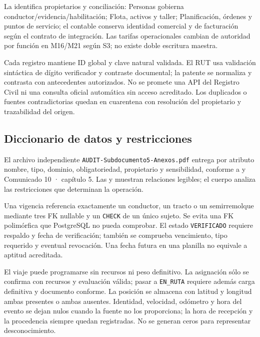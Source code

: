 La  identifica propietarios y conciliación: Personas gobierna conductor/evidencia/habilitación; Flota, activos y taller; Planificación, órdenes y puntos de servicio; el contable conserva identidad comercial y de facturación según el contrato de integración. Las tarifas operacionales cambian de autoridad por función en M16/M21 según S3; no existe doble escritura maestra.

Cada registro mantiene ID global y clave natural validada. El RUT usa validación sintáctica de dígito verificador y contraste documental; la patente se normaliza y contrasta con antecedentes autorizados. No se promete una API del Registro Civil ni una consulta oficial automática sin acceso acreditado. Los duplicados o fuentes contradictorias quedan en cuarentena con resolución del propietario y trazabilidad del origen.

\FloatBarrier
\subsection{Diccionario de datos y restricciones}\label{sec:5-diccionario}\label{sec:05-diccionario-de-datos-y-restricciones}

El archivo independiente \texttt{AUDIT-Subdocumento5-Anexos.pdf} entrega por atributo nombre, tipo, dominio, obligatoriedad, propietario y sensibilidad, conforme a  y Comunicado 10 · capítulo 5. Las  y  muestran relaciones legibles; el cuerpo analiza las restricciones que determinan la operación.

Una vigencia referencia exactamente un conductor, un tracto o un semirremolque mediante tres FK nullable y un \texttt{CHECK} de un único sujeto. Se evita una FK polimórfica que PostgreSQL no pueda comprobar. El estado \texttt{VERIFICADO} requiere respaldo y fecha de verificación; también se comprueba vencimiento, tipo requerido y eventual revocación. Una fecha futura en una planilla no equivale a aptitud acreditada.

El viaje puede programarse sin recursos ni peso definitivo. La asignación sólo se confirma con recursos y evaluación válida; pasar a \texttt{EN\_\allowbreak{}RUTA} requiere además carga definitiva y documento conforme. La posición se almacena con latitud y longitud ambas presentes o ambas ausentes. Identidad, velocidad, odómetro y hora del evento se dejan nulos cuando la fuente no los proporciona; la hora de recepción y la procedencia siempre quedan registradas. No se generan ceros para representar desconocimiento.

